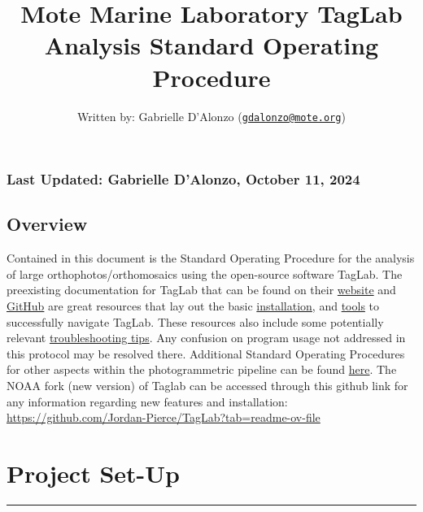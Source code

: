 \documentclass[
]{article}
\title{Mote Marine Laboratory TagLab Analysis Standard Operating
Procedure}
\author{Written by: Gabrielle D'Alonzo
(\href{mailto:gdalonzo@mote.org}{\nolinkurl{gdalonzo@mote.org}})}
\date{}
\begin{document}
\maketitle

\hypertarget{last-updated-gabrielle-dalonzo-october-11-2024}{%
\subsubsection{Last Updated: Gabrielle D'Alonzo, October 11,
2024}\label{last-updated-gabrielle-dalonzo-october-11-2024}}

\hypertarget{overview}{%
\subsection{Overview}\label{overview}}

Contained in this document is the Standard Operating Procedure for the
analysis of large orthophotos/orthomosaics using the open-source
software TagLab. The preexisting documentation for TagLab that can be
found on their \href{https://taglab.isti.cnr.it/}{website} and
\href{https://github.com/cnr-isti-vclab/TagLab}{GitHub} are great
resources that lay out the basic
\href{https://github.com/cnr-isti-vclab/TagLab/wiki/Install-TagLab}{installation},
and \href{https://taglab.isti.cnr.it/docs}{tools} to successfully
navigate TagLab. These resources also include some potentially relevant
\href{https://github.com/cnr-isti-vclab/TagLab/wiki/Install-TagLab}{troubleshooting
tips}. Any confusion on program usage not addressed in this protocol may
be resolved there. Additional Standard Operating Procedures for other
aspects within the photogrammetric pipeline can be found
\href{https://github.com/icombs2017/MoteSOPs}{here}. The NOAA fork (new
version) of Taglab can be accessed through this github link for any
information regarding new features and installation:
\url{https://github.com/Jordan-Pierce/TagLab?tab=readme-ov-file}

\hypertarget{project-set-up}{%
\section{Project Set-Up}\label{project-set-up}}

\begin{center}\rule{0.5\linewidth}{0.5pt}\end{center}
\end{document}
